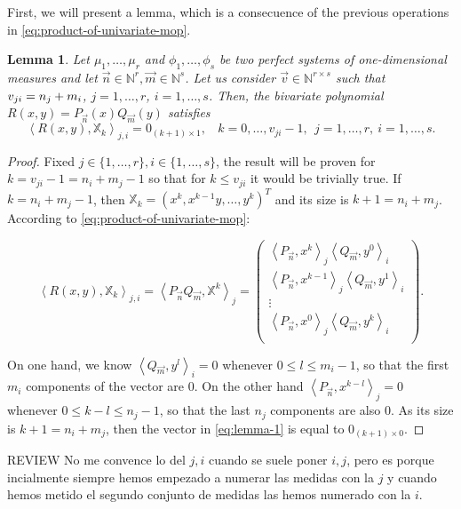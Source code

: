 \documentclass[12pt,a4]{report}
\theoremstyle{plain}
\newtheorem{lemma}[theorem]{Lemma}
\newcommand{\N}[0]{\mathbb{N}}
\newcommand{\cred}[1]{{\color{red} #1}}
\newcommand{\prodesc}[2]{\left\langle #1 , #2 \right\rangle}
\begin{document}
  First, we will present a lemma, which is a consecuence of the previous operations in \eqref{eq:product-of-univariate-mop}.
  \begin{lemma}
    Let $\mu_1,\dots,\mu_r$ and $\phi_1,\dots,\phi_s$ be two perfect systems of one-dimensional measures and let $\vec n\in \N^r, \vec m\in\N^s$. Let us consider $\vec v\in\N^{r\times s}$ such that $v_{ji}= \nolinebreak n_j+m_i$, $j=1,\dots,r$, $i=1,\dots,s$. Then, the bivariate polynomial $R(x,y)=P_{\vec n}(x) Q_{\vec m}(y)$ satisfies
    $$
    \prodesc{R(x,y)}{\mathbb X_k}_{j,i} = 0_{(k+1)\times 1}, \ \ \ \ k=0,\dots,v_{ji}-1, \ \  j=1,\dots,r, \ i = 1,\dots,s.
    $$
  \end{lemma}
  \begin{proof}

    Fixed $j\in\{1,\dots,r\}, i\in\{1,\dots,s\}$, the result will be proven for \linebreak $k=v_{ji}-1=n_i+m_j-1$ so that for $k\leq v_{ji}$ it would be trivially true. If $k=n_i+m_j-1$, then $\mathbb X_k = (x^k, x^{k-1}y,\dots,y^k)^T$ and its size is $k+1=n_i+m_j$. According to \eqref{eq:product-of-univariate-mop}:

    \begin{equation}
        \label{eq:lemma-1}
            \prodesc{R(x,y)}{\mathbb X_k}_{j,i} = \prodesc{P_{\vec n}Q_{\vec m} }{\mathbb X^k}_j = \begin{pmatrix}
                \prodesc{P_{\vec n}}{x^k}_j \prodesc{Q_{\vec m}}{y^0}_i \\
                \prodesc{P_{\vec n}}{x^{k-1}}_j \prodesc{Q_{\vec m}}{y^1}_i \\
                \vdots \\
                \prodesc{P_{\vec n}}{x^0}_j \prodesc{Q_{\vec m}}{y^k}_i \\
            \end{pmatrix}.
    \end{equation}

    On one hand, we know $\prodesc{Q_{\vec m}}{y^l}_i =0$ whenever $0\leq l \leq m_i-1$, so that the first $m_i$ components of the vector are $0$. On the other hand $\prodesc{P_{\vec n}}{x^{k-l}}_j =0$ whenever $0\leq k-l \leq n_j-1$, so that the last $n_j$ components are also $0$. As its size is $k+1=n_i+m_j$, then the vector in \eqref{eq:lemma-1} is equal to $0_{(k+1)\times 0}$.

  \end{proof}

  \cred{REVIEW No me convence lo del $j,i$ cuando se suele poner $i,j$, pero es porque incialmente siempre hemos empezado a numerar las medidas con la $j$ y cuando hemos metido el segundo conjunto de medidas las hemos numerado con la $i$.}
\end{document}
